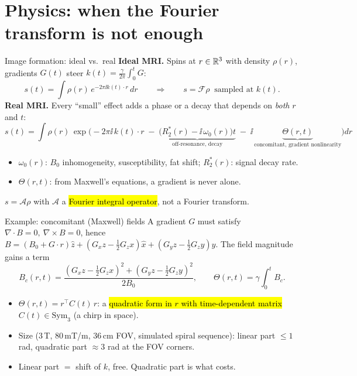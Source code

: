 \section{Physics: when the Fourier transform is not enough}

\begin{frame}{Image formation: ideal vs.\ real}
\textbf{Ideal MRI.} Spins at $r\in\mathbb R^3$ with density $\rho(r)$, gradients $G(t)$ steer
$k(t)=\tfrac{\gamma}{2\pi}\!\int_0^t G$:
\[ s(t)=\int \rho(r)\,e^{-2\pi\ii k(t)\cdot r}\,dr \qquad\Longrightarrow\qquad s=\mathcal F\rho\ \text{ sampled at }k(t).\]
\pause
\textbf{Real MRI.} Every ``small'' effect adds a phase or a decay that depends on \emph{both} $r$ and $t$:
\[ s(t)=\int \rho(r)\,\exp\!\Big(-2\pi\ii\, k(t)\!\cdot\! r\;-\;\underbrace{\big(R_2^*(r)-\ii\,\omega_0(r)\big)t}_{\text{off-resonance, decay}}\;-\;\ii\,\underbrace{\Theta(r,t)}_{\text{concomitant, gradient nonlinearity}}\Big)dr \]
\vspace{-1mm}
\begin{itemize}
\item $\omega_0(r)$: $B_0$ inhomogeneity, susceptibility, fat shift; $R_2^*(r)$: signal decay rate.
\item $\Theta(r,t)$: from Maxwell's equations, a gradient is never alone.
\end{itemize}
\pause
\centering\Large $s = \mathcal A\rho$ with $\mathcal A$ a \hl{Fourier integral operator}, not a Fourier transform.
\end{frame}

\iflong
\begin{frame}{Example: concomitant (Maxwell) fields}
A gradient $G$ must satisfy $\nabla\!\cdot\!B=0,\ \nabla\!\times\!B=0$, hence $B=(B_0+G\!\cdot\! r)\hat z+(G_x z-\tfrac12G_z x)\hat x+(G_y z-\tfrac12 G_z y)\hat y$. The field magnitude gains a term
\[ B_c(r,t)=\frac{(G_x z-\tfrac12 G_z x)^2+(G_y z-\tfrac12 G_z y)^2}{2B_0},\qquad \Theta(r,t)=\gamma\!\int_0^t B_c . \]
\pause
\begin{itemize}
\item $\Theta(r,t)=r^{\!\top}C(t)\,r$: a \hl{quadratic form in $r$ with time-dependent matrix} $C(t)\in\mathrm{Sym}_3$ (a chirp in space).
\item Size (3\,T, 80\,mT/m, 36\,cm FOV, simulated spiral sequence): linear part $\le 1$ rad, quadratic part $\approx 3$ rad at the FOV corners.
\item Linear part $=$ shift of $k$, free. Quadratic part is what costs.
\end{itemize}
\pause
{}
\end{frame}
\fi

